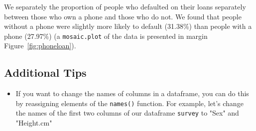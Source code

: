 \documentclass{tufte-book}\usepackage[]{graphicx}\usepackage[]{color}
\makeatletter
\newcommand{\hlstr}[1]{\textcolor[rgb]{0.192,0.494,0.8}{#1}}%
\newcommand{\hlopt}[1]{\textcolor[rgb]{0,0,0}{#1}}%
\newcommand{\hlstd}[1]{\textcolor[rgb]{0.345,0.345,0.345}{#1}}%
\newcommand{\hlkwd}[1]{\textcolor[rgb]{0.737,0.353,0.396}{\textbf{#1}}}%
\newenvironment{kframe}{%
 \def\at@end@of@kframe{}%
 \ifinner\ifhmode%
  \def\at@end@of@kframe{\end{minipage}}%
  \begin{minipage}{\columnwidth}%
 \fi\fi%
 \def\FrameCommand##1{\hskip\@totalleftmargin \hskip-\fboxsep
 \colorbox{shadecolor}{##1}\hskip-\fboxsep
     \hskip-\linewidth \hskip-\@totalleftmargin \hskip\columnwidth}%
 \MakeFramed {\advance\hsize-\width
   \@totalleftmargin\z@ \linewidth\hsize
   \@setminipage}}%
 {\par\unskip\endMakeFramed%
 \at@end@of@kframe}
\newenvironment{knitrout}{}{} %
\makeatother
\begin{document}
\begin{footnotesize}
\begin{enumerate}

We separately the proportion of people who defaulted on their loans separately between those who own a phone and those who do not. We found that people without a phone were slightly more likely to default (31.38\%) than people with a phone (27.97\%) (a \texttt{mosaic.plot} of the data is presented in margin Figure~\ref{fig:phoneloan}).
  
  
\end{enumerate}


\subsection{Additional Tips}

\begin{itemize}
  \item If you want to change the names of columns in a dataframe, you can do this by reassigning elements of the \texttt{names()} function. For example, let's change the names of the first two columns of our dataframe \texttt{survey} to "Sex" and "Height.cm"



\end{itemize}
\end{footnotesize}
\end{document}
